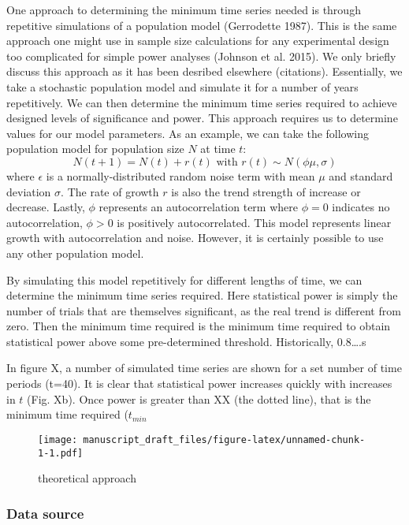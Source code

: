 \documentclass[11pt,]{article}
\begin{document}
One approach to determining the minimum time series needed is through
repetitive simulations of a population model (Gerrodette 1987). This is
the same approach one might use in sample size calculations for any
experimental design too complicated for simple power analyses (Johnson
et al. 2015). We only briefly discuss this approach as it has been
desribed elsewhere (citations). Essentially, we take a stochastic
population model and simulate it for a number of years repetitively. We
can then determine the minimum time series required to achieve designed
levels of significance and power. This approach requires us to determine
values for our model parameters. As an example, we can take the
following population model for population size \(N\) at time \(t\): \[
N(t + 1) = N(t) + r(t) \mbox{ with } r(t) \sim N(\phi \mu, \sigma)
\] where \(\epsilon\) is a normally-distributed random noise term with
mean \(\mu\) and standard deviation \(\sigma\). The rate of growth \(r\)
is also the trend strength of increase or decrease. Lastly, \(\phi\)
represents an autocorrelation term where \(\phi=0\) indicates no
autocorrelation, \(\phi>0\) is positively autocorrelated. This model
represents linear growth with autocorrelation and noise. However, it is
certainly possible to use any other population model.

By simulating this model repetitively for different lengths of time, we
can determine the minimum time series required. Here statistical power
is simply the number of trials that are themselves significant, as the
real trend is different from zero. Then the minimum time required is the
minimum time required to obtain statistical power above some
pre-determined threshold. Historically, 0.8\ldots{}.s

In figure X, a number of simulated time series are shown for a set
number of time periods (t=40). It is clear that statistical power
increases quickly with increases in \(t\) (Fig. Xb). Once power is
greater than XX (the dotted line), that is the minimum time required
(\(t_{min}\)

\begin{figure}[htbp]
\centering
\texttt{[image: manuscript\_draft\_files/figure-latex/unnamed-chunk-1-1.pdf]}
\caption{theoretical approach\label{fig:theoretical_approach}}
\end{figure}

\subsubsection{Data source}\label{data-source}
\end{document}
